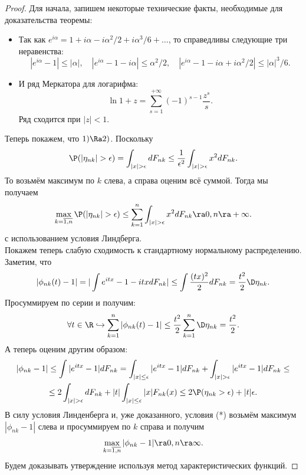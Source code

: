 \begin{proof}
    Для начала, запишем некоторые технические факты, необходимые для доказательства теоремы:
    \begin{itemize}
        \item Так как $e^{i \alpha} = 1 + i \alpha - i \alpha^2/2 + i \alpha^3/6 + \ldots$, то справедливы следующие три неравенства:
        \[
            |e^{i\alpha} - 1| \leq |\alpha|, \quad |e^{i\alpha} - 1 - i \alpha| \leq \alpha^2/2, \quad |e^{i\alpha} - 1 - i\alpha + i \alpha^2/2| \leq |\alpha|^3/6.
        \]
        \item И ряд Меркатора для логарифма:
        \[
            \ln 1 + z = \sum\limits_{s = 1}^{+\infty} (-1)^{s - 1}\dfrac{z^s}{s}.
        \]
        Ряд сходится при $|z| < 1$.
    \end{itemize}
    Теперь покажем, что $1) \Ra 2)$.
    Поскольку
    \[
        \P(|\eta_{nk}| > \epsilon) = \int_{|x| > \epsilon} dF_{nk} \leq \dfrac{1}{\epsilon^2} \int_{|x| > \epsilon}x^2 dF_{nk}.
    \]
    То возьмём максимум по $k$ слева, а справа оценим всё суммой. Тогда мы получаем
    \[
        \max\limits_{k = \overline{1, n}} \P(|\eta_{nk}| > \epsilon) \leq \sum\limits_{k = 1}^{n} \int_{|x| > \epsilon} x^2 dF_{nk} \ra 0, n \ra +\infty.
    \]
    с использованием условия Линдберга. \\
    Покажем теперь слабую сходимость к стандартному нормальному распределению.
    Заметим, что
    \[
        |\phi_{nk}(t) - 1| = |\int e^{itx} - 1 - itx dF_{nk}| \leq \int \dfrac{(tx)^2}{2}dF_{nk} = \dfrac{t^2}{2}\D \eta_{nk}.
    \]
    Просуммируем по серии и получим:
    \[
        \forall t \in \R \hookrightarrow \sum\limits_{k = 1}^{n} |\phi_{nk}(t) - 1| \leq \dfrac{t^2}{2}\sum\limits_{k = 1}^{n} \D\eta_{nk} = \dfrac{t^2}{2}.
    \]
    А теперь оценим другим образом:
    \begin{multline*}
        |\phi_{nk} - 1| \leq \int |e^{itx} - 1|dF_{nk} = \int_{|x| \leq \epsilon} |e^{itx} - 1|dF_{nk} + \int_{|x| > \epsilon} |e^{itx} - 1|dF_{nk} \leq \\ \leq 2\int_{|x| > \epsilon}dF_{nk} + |t|\int_{|x| \leq \epsilon} |x|F_{nk}(x) \leq 2\P(\eta_{nk} > \epsilon) + |t|\epsilon.
    \end{multline*}
    В силу условия Линденберга и, уже доказанного, условия (*) возьмём максимум $|\phi_{nk} - 1|$ слева и просуммируем по $k$ справа и получим
    \[
        \max\limits_{k = \overline{1, n}}|\phi_{nk} - 1| \ra 0, n \ra \infty.
    \]
    Будем доказывать утверждение используя метод характеристических функций.

\end{proof}
